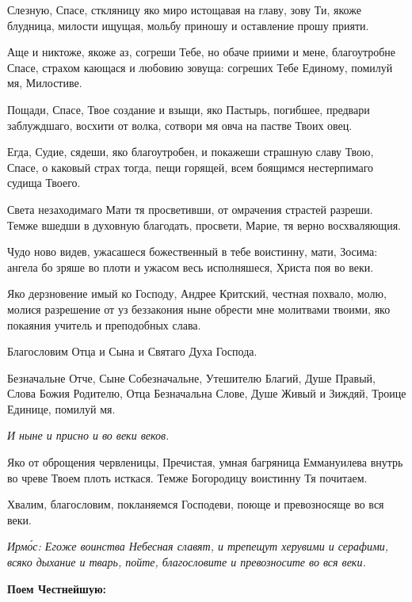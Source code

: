 Слезную, Спасе, сткляницу яко миро истощавая на главу, зову Ти, якоже блудница, милости ищущая, мольбу приношу и оставление прошу прияти.

Аще и никтоже, якоже аз, согреши Тебе, но обаче приими и мене, благоутробне Спасе, страхом кающася и любовию зовуща: согреших Тебе Единому, помилуй мя, Милостиве.

Пощади, Спасе, Твое создание и взыщи, яко Пастырь, погибшее, предвари заблуждшаго, восхити от волка, сотвори мя овча на пастве Твоих овец.

Егда, Судие, сядеши, яко благоутробен, и покажеши страшную славу Твою, Спасе, о каковый страх тогда, пещи горящей, всем боящимся нестерпимаго судища Твоего.


Света незаходимаго Мати тя просветивши, от омрачения страстей разреши. Темже вшедши в духовную благодать, просвети, Марие, тя верно восхваляющия.


Чудо ново видев, ужасашеся божественный в тебе воистинну, мати, Зосима: ангела бо зряше во плоти и ужасом весь исполняшеся, Христа поя во веки.


Яко дерзновение имый ко Господу, Андрее Критский, честная похвало, молю, молися разрешение от уз беззакония ныне обрести мне молитвами твоими, яко покаяния учитель и преподобных слава.

Благословим Отца и Сына и Святаго Духа Господа.

Безначальне Отче, Сыне Собезначальне, Утешителю Благий, Душе Правый, Слова Божия Родителю, Отца Безначальна Слове, Душе Живый и Зиждяй, Троице Единице, помилуй мя.

\itshape И ныне\normalfont{} и присно и во веки веков.

Яко от оброщения червленицы, Пречистая, умная багряница Еммануилева внутрь во чреве Твоем плоть исткася. Темже Богородицу воистинну Тя почитаем.

Хвалим, благословим, покланяемся Господеви, поюще и превозносяще во вся веки.

\itshape Ирм\'{о}с\normalfont{}: Егоже воинства Небесная славят, и трепещут херувими и серафими, всяко дыхание и тварь, пойте, благословите и превозносите во вся веки. 

\medskip\bfseries Поем Честнейшую:

